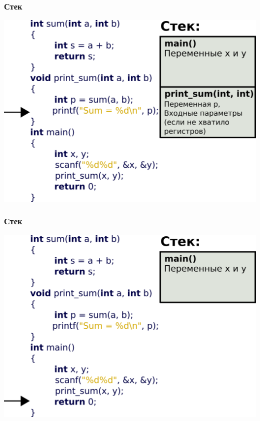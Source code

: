 \documentclass[12pt,pdf,hyperref={unicode}]{beamer}
\begin{document}
\begin{frame}[fragile]
\frametitle{Стек} 
\begin{center}
\includegraphics[width=\linewidth]{images/stack4.png}
\end{center}
\end{frame}

\begin{frame}[fragile]
\frametitle{Стек} 
\begin{center}
\includegraphics[width=\linewidth]{images/stack5.png}
\end{center}
\end{frame}
\end{document}
